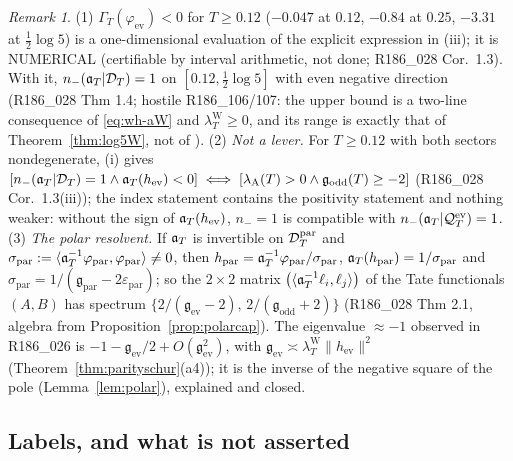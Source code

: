 \documentclass[11pt]{amsart}
\theoremstyle{definition}
\theoremstyle{remark}
\newtheorem{remark}[theorem]{Remark}
\newcommand{\lamW}{\lambda^{\mathrm W}_T}
\begin{document}
\begin{remark}\label{rem:wh-index}
(1) $\Gamma_T(\varphi_{\mathrm{ev}})<0$ for $T\ge0.12$ ($-0.047$ at $0.12$, $-0.84$ at $0.25$, $-3.31$ at $\frac12\log5$) is a one-dimensional
evaluation of the explicit expression in (iii); it is NUMERICAL (certifiable by interval arithmetic, not done; R186\_028 Cor.~1.3).
With it, $n_-(\mathfrak a_T|\mathcal D_T)=1$ on $[0.12,\frac12\log5]$ with even negative direction (R186\_028 Thm 1.4; hostile R186\_106/107: the upper bound
is a two-line consequence of \eqref{eq:wh-aW} and $\lamW\ge0$, and its range is exactly that of Theorem~\ref{thm:log5W}, not of \cite{Zhu2026}).
(2) \emph{Not a lever.} For $T\ge0.12$ with both sectors nondegenerate, (i) gives $[n_-(\mathfrak a_T|\mathcal D_T)=1\wedge\mathfrak a_T(h_{\mathrm{ev}})<0]\iff
[\lambda_{\mathrm A}(T)>0\wedge\mathfrak g_{\mathrm{odd}}(T)\ge-2]$ (R186\_028 Cor.~1.3(iii)); the index statement contains the positivity
statement and nothing weaker: without the sign of $\mathfrak a_T(h_{\mathrm{ev}})$, $n_-=1$ is compatible with $n_-(\mathfrak a_T|\mathcal Q^{\mathrm{ev}}_T)=1$.
(3) \emph{The polar resolvent.} If $\mathfrak a_T$ is invertible on $\mathcal D_T^{\mathrm{par}}$ and $\sigma_{\mathrm{par}}:=\langle\mathfrak a_T^{-1}\varphi_{\mathrm{par}},\varphi_{\mathrm{par}}\rangle\ne0$,
then $h_{\mathrm{par}}=\mathfrak a_T^{-1}\varphi_{\mathrm{par}}/\sigma_{\mathrm{par}}$, $\mathfrak a_T(h_{\mathrm{par}})=1/\sigma_{\mathrm{par}}$ and
$\sigma_{\mathrm{par}}=1/(\mathfrak g_{\mathrm{par}}-2\varepsilon_{\mathrm{par}})$; so the $2\times2$ matrix $\big(\langle\mathfrak a_T^{-1}\ell_i,\ell_j\rangle\big)$ of
the Tate functionals $(A,B)$ has spectrum $\{2/(\mathfrak g_{\mathrm{ev}}-2),\,2/(\mathfrak g_{\mathrm{odd}}+2)\}$ (R186\_028 Thm 2.1, algebra from
Proposition~\ref{prop:polarcap}). The eigenvalue $\approx-1$ observed in R186\_026 is $-1-\mathfrak g_{\mathrm{ev}}/2+O(\mathfrak g_{\mathrm{ev}}^2)$,
with $\mathfrak g_{\mathrm{ev}}\asymp\lamW\|h_{\mathrm{ev}}\|^2$ (Theorem~\ref{thm:parityschur}(a4)); it is the inverse of the negative square
of the pole (Lemma~\ref{lem:polar}), explained and closed.
\end{remark}

\subsection{Labels, and what is not asserted}\label{subsec:wh-labels}
\end{document}

